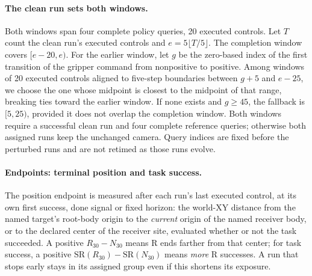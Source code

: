 \paragraph{The clean run sets both windows.}
Both windows span four complete policy queries, 20 executed controls. Let $T$ count the clean run's executed controls and $e=5\lfloor T/5\rfloor$. The completion window covers $[e-20,e)$. For the earlier window, let $g$ be the zero-based index of the first transition of the gripper command from nonpositive to positive. Among windows of 20 executed controls aligned to five-step boundaries between $g+5$ and $e-25$, we choose the one whose midpoint is closest to the midpoint of that range, breaking ties toward the earlier window. If none exists and $g\ge45$, the fallback is $[5,25)$, provided it does not overlap the completion window. Both windows require a successful clean run and four complete reference queries; otherwise both assigned runs keep the unchanged camera. Query indices are fixed before the perturbed runs and are not retimed as those runs evolve.

\paragraph{Endpoints: terminal position and task success.}
The position endpoint is measured after each run's last executed control, at its own first success, done signal or fixed horizon: the world-XY distance from the named target's root-body origin to the \emph{current} origin of the named receiver body, or to the declared center of the receiver site, evaluated whether or not the task succeeded. A positive $R_{30}-N_{30}$ means R ends farther from that center; for task success, a positive $\mathrm{SR}(R_{30})-\mathrm{SR}(N_{30})$ means \emph{more} R successes. A run that stops early stays in its assigned group even if this shortens its exposure.

